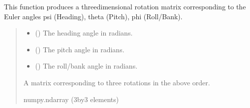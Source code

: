 \documentclass[letterpaper,10pt,english]{sphinxmanual}
\begin{document}
\begin{fulllineitems}
\label{\detokenize{modules/util/transformations:qnav.util.transformations.rotate_3d}}
\pysigstartsignatures
{}
\pysigstopsignatures
\sphinxAtStartPar
This function produces a three\sphinxhyphen{}dimensional rotation matrix corresponding
to the Euler angles psi (Heading), theta (Pitch), phi (Roll/Bank).
\begin{quote}\begin{description}
\begin{itemize}
\item {} 
\sphinxAtStartPar
{} () \textendash{} The heading angle in radians.

\item {} 
\sphinxAtStartPar
{} () \textendash{} The pitch angle in radians.

\item {} 
\sphinxAtStartPar
{} () \textendash{} The roll/bank angle in radians.

\end{itemize}

\sphinxAtStartPar
A matrix corresponding to three rotations in the above order.

\sphinxAtStartPar
numpy.ndarray (3\sphinxhyphen{}by\sphinxhyphen{}3 elements)

\end{description}\end{quote}

\end{fulllineitems}

\end{document}
